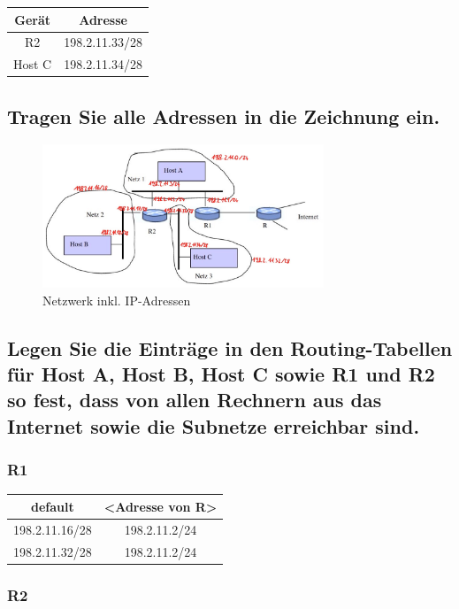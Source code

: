 \documentclass{article}
\begin{document}
\begin{tabular}{|c|c|}
	\hline
	Gerät  & Adresse        \\
	\hline
	R2     & 198.2.11.33/28 \\
	\hline
	Host C & 198.2.11.34/28 \\
	\hline
\end{tabular}

\subsection{Tragen Sie alle Adressen in die Zeichnung ein.}

\begin{figure}[ht]
	\includegraphics[width=0.75\textwidth]{annotated}
	\centering
	\caption{Netzwerk inkl. IP-Adressen}
\end{figure}

\subsection{Legen Sie die Einträge in den Routing-Tabellen für Host A, Host B, Host C sowie R1 und R2 so
fest, dass von allen Rechnern aus das Internet sowie die Subnetze erreichbar sind.}

\vspace{1em}

\subsubsection*{R1}

\begin{tabular}{|c|c|}
	\hline
	default        & <Adresse von R> \\
	\hline
	198.2.11.16/28 & 198.2.11.2/24   \\
	\hline
	198.2.11.32/28 & 198.2.11.2/24   \\
	\hline
\end{tabular}

\subsubsection*{R2}
\end{document}
